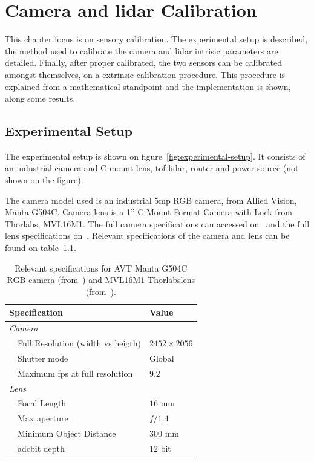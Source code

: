 \chapter{Camera and \acs{lidar} Calibration}
\label{chapter:calibration}

This chapter focus is on sensory calibration. The experimental setup is described, the method used to calibrate the camera and \ac{lidar} intrisic parameters are detailed. Finally, after proper calibrated, the two sensors can be calibrated amongst themselves, on a extrinsic calibration procedure. This procedure is explained from a mathematical standpoint and the implementation is shown, along some results.


\section{Experimental Setup}
The experimental setup is shown on figure~\ref{fig:experimental-setup}. It consists of an industrial camera and C-mount lens, \ac{tof} \ac{lidar}, router and power source (not shown on the figure). 

The camera model used is an industrial 5\ac{mp} RGB camera, from Allied Vision, Manta G504C. Camera lens is a 1'' C-Mount Format Camera with Lock from Thorlabs\cp, MVL16M1. The full camera specifications can accessed on~\cite{MantaG504C} and the full lens specifications on~\cite{Thorlabs}. Relevant specifications of the camera and lens can be found on table~\ref{tab:camera-and-lens-specs}. 

\begin{table}[H]
	\renewcommand{\arraystretch}{1.2}
	\centering
	\begin{tabular}{@{}lp{7cm}l@{}}
		\toprule
		\multicolumn{2}{l}{Specification} & Value \\ \midrule
		\multicolumn{2}{l}{\emph{Camera}} & \\
		\phantom{a} & Full Resolution (width vs heigth) & $2452 \times 2056$   \\
									& Shutter mode & Global \\
									&	Maximum \ac{fps} at full resolution & $9.2$ \\ \midrule 
									\multicolumn{2}{l}{\emph{Lens}} \\
									&	Focal Length & $16$ mm \\
									&	Max aperture & $f/1.4$ \\
									&	Minimum Object Distance & $300$ mm  \\
									& \acs{adc}\footnotemark bit depth & $12$ bit \\
		\bottomrule
	\end{tabular}
	\caption{Relevant specifications for AVT Manta G504C RGB camera (from~\cite{MantaG504C})  and MVL16M1 Thorlabs\cp lens (from~\cite{Thorlabs}).}
	\label{tab:camera-and-lens-specs}
\end{table}


